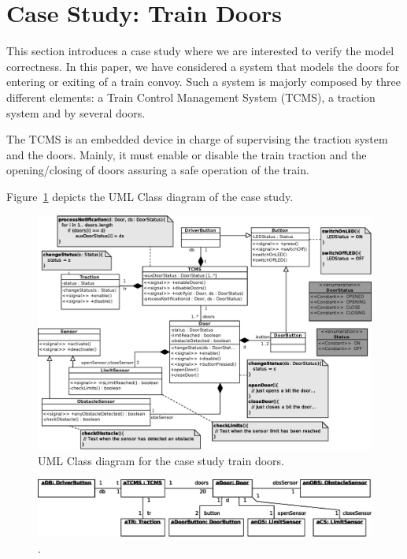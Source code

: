 \section{Case Study: Train Doors}
\label{sec:casestudy}

This section introduces a case study where we are
interested to verify the model correctness. In this paper, we have considered
a system that models the doors for entering or exiting of a train convoy. Such
a system is  majorly composed by three different elements: a Train Control
Management System (TCMS), a traction system and by several doors. 

The TCMS is an embedded device in charge of supervising the traction system and
the doors. Mainly, it must enable or disable the train traction and the
opening/closing of doors assuring a safe operation of the train.

Figure~\ref{fig:UMLClassDiagram-TrainDoors} depicts the UML Class diagram of
the case study. \TODO{\ldots}



\begin{figure}
  \centering
  \includegraphics[width=1\columnwidth]{images/UMLClassDiagram-TrainDoors}
  \caption{UML Class diagram for the case study train doors.}
  \label{fig:UMLClassDiagram-TrainDoors}
\end{figure}


\begin{figure}
  \centering
  \includegraphics[width=1\columnwidth]{images/UMLObjectDiagram-TrainDoors}
  \caption{.}
  \label{fig:}
\end{figure}